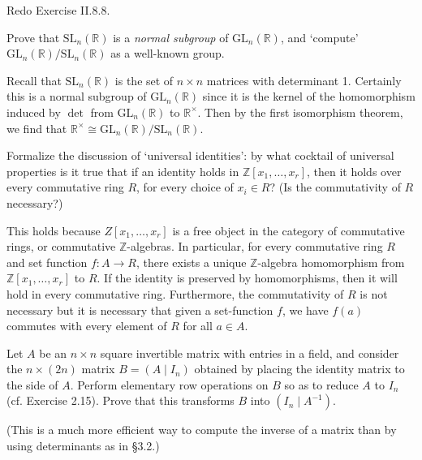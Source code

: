\documentclass[../../master.tex]{subfiles}
\begin{document}
\begin{problem}
    Redo Exercise II.8.8.
    \begin{proposition}[Exercise II.8.8] 
        \textup{Prove that $\text{SL}_n(\mathbb{R})$ is a \textit{normal subgroup} of $\text{GL}_n(\mathbb{R})$, and `compute' $\text{GL}_n(\mathbb{R}) / \text{SL}_n(\mathbb{R})$ as a well-known group.}
    \end{proposition}
\end{problem}

\begin{solution}
    Recall that $\text{SL}_n(\mathbb{R})$ is the set of $n \times n$ matrices with determinant 1.
    Certainly this is a normal subgroup of $\text{GL}_n(\mathbb{R})$ since it is the kernel of the homomorphism induced by $\det$ from $\text{GL}_n(\mathbb{R})$ to $\mathbb{R}^{\times}$.
    Then by the first isomorphism theorem, we find that $\mathbb{R}^{\times} \cong \text{GL}_n(\mathbb{R}) / \text{SL}_n(\mathbb{R})$.
\end{solution}

\begin{problem}
    Formalize the discussion of `universal identities':
    by what cocktail of universal properties is it true that if an identity holds in $\mathbb{Z}[x_1, \ldots, x_r]$, then it holds over every commutative ring $R$, for every choice of $x_i \in R$?
    (Is the commutativity of $R$ necessary?)
\end{problem}

\begin{solution}
    This holds because $Z[x_1, \ldots, x_r]$ is a free object in the category of commutative rings, or commutative $\mathbb{Z}$-algebras.
    In particular, for every commutative ring $R$ and set function $f : A \to R$, there exists a unique $\mathbb{Z}$-algebra homomorphism from $\mathbb{Z}[x_1, \ldots, x_r]$ to $R$.
    If the identity is preserved by homomorphisms, then it will hold in every commutative ring.
    Furthermore, the commutativity of $R$ is not necessary but it is necessary that given a set-function $f$, we have $f(a)$ commutes with every element of $R$ for all $a \in A$.
\end{solution}

\begin{problem}
    Let $A$ be an $n \times n$ square invertible matrix with entries in a field, and consider the $n \times (2n)$ matrix $B = (A \mid I_n)$ obtained by placing the identity matrix to the side of $A$.
    Perform elementary row operations on $B$ so as to reduce $A$ to $I_n$ (cf. Exercise 2.15).
    Prove that this transforms $B$ into $(I_n \mid A^{-1})$.

    (This is a much more efficient way to compute the inverse of a matrix than by using determinants as in \S 3.2.)
\end{problem}
\end{document}
